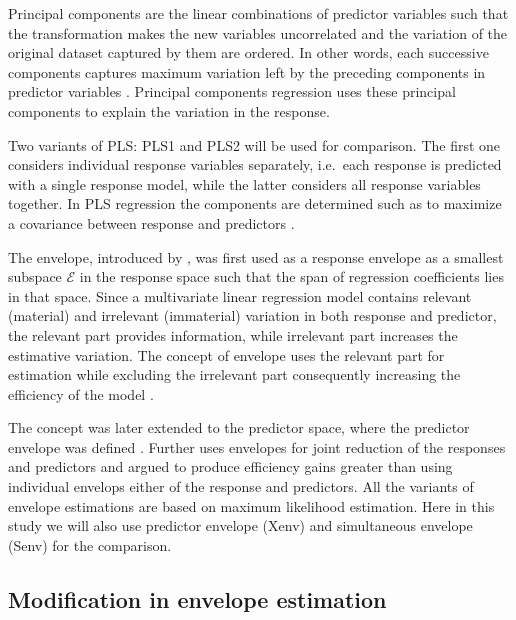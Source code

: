 \documentclass[12pt,3p,authoryear]{elsarticle}
\providecommand{\tightlist}{%
  \setlength{\itemsep}{0pt}\setlength{\parskip}{0pt}}
\begin{document}
\begin{description}
\tightlist
\item[\emph{Principal Components Regression (PCR):}]
Principal components are the linear combinations of predictor variables
such that the transformation makes the new variables uncorrelated and
the variation of the original dataset captured by them are ordered. In
other words, each successive components captures maximum variation left
by the preceding components in predictor variables \citep{Jolliffe2002}.
Principal components regression uses these principal components to
explain the variation in the response.
\item[\emph{Partial Least Squares (PLS):}]
Two variants of PLS: PLS1 and PLS2 will be used for comparison. The
first one considers individual response variables separately, i.e.~each
response is predicted with a single response model, while the latter
considers all response variables together. In PLS regression the
components are determined such as to maximize a covariance between
response and predictors \citep{DeJong1993}.
\item[\emph{Envelopes:}]
The envelope, introduced by \citet{Cook2007a}, was first used as a
response envelope \citep{cook2010envelope} as a smallest subspace
\(\mathcal{E}\) in the response space such that the span of regression
coefficients lies in that space. Since a multivariate linear regression
model contains relevant (material) and irrelevant (immaterial) variation
in both response and predictor, the relevant part provides information,
while irrelevant part increases the estimative variation. The concept of
envelope uses the relevant part for estimation while excluding the
irrelevant part consequently increasing the efficiency of the model
\citep{cook2016algorithms}.

The concept was later extended to the predictor space, where the
predictor envelope was defined \citep{cook2013envelopes}. Further
\citet{cook2015simultaneous} uses envelopes for joint reduction of the
responses and predictors and argued to produce efficiency gains greater
than using individual envelops either of the response and predictors.
All the variants of envelope estimations are based on maximum likelihood
estimation. Here in this study we will also use predictor envelope
(Xenv) and simultaneous envelope (Senv) for the comparison.
\end{description}

\subsection{Modification in envelope
estimation}\label{modification-in-envelope-estimation}
\end{document}
